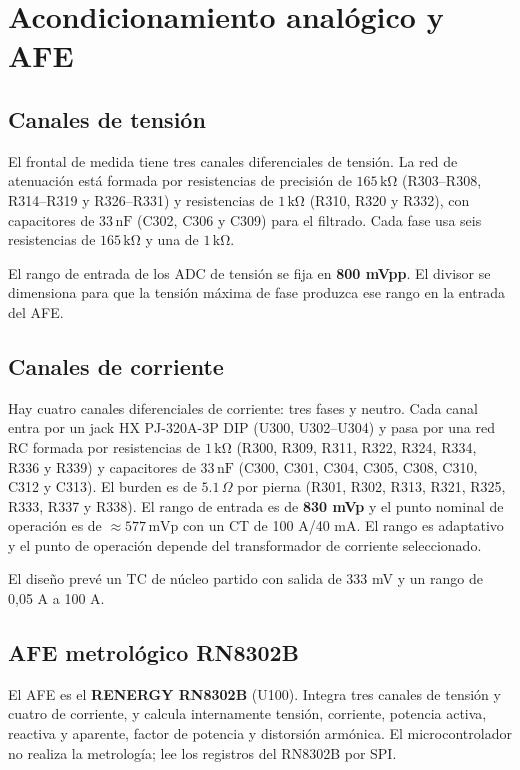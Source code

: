 \documentclass[11pt,a4paper]{article}
\begin{document}
\section{Acondicionamiento analógico y AFE}
\label{sec:medicion}

\subsection{Canales de tensión}

El frontal de medida tiene tres canales diferenciales de tensión. La red de
atenuación está formada por resistencias de precisión de
$165\,\mathrm{k\Omega}$ (R303--R308, R314--R319 y R326--R331) y resistencias de
$1\,\mathrm{k\Omega}$ (R310, R320 y R332), con capacitores de
$33\,\mathrm{nF}$ (C302, C306 y C309) para el filtrado. Cada fase
usa seis resistencias de $165\,\mathrm{k\Omega}$ y una de $1\,\mathrm{k\Omega}$.

El rango de entrada de los ADC de tensión se fija en \textbf{800 mVpp}. El
divisor se dimensiona para que la tensión máxima de fase produzca ese rango en
la entrada del AFE.

\subsection{Canales de corriente}

Hay cuatro canales diferenciales de corriente: tres fases y neutro. Cada canal
entra por un jack HX PJ-320A-3P DIP (U300, U302--U304) y pasa por
una red RC formada por resistencias de $1\,\mathrm{k\Omega}$ (R300, R309, R311, R322, R324, R334, R336 y R339) y
capacitores de $33\,\mathrm{nF}$ (C300, C301, C304, C305, C308, C310, C312 y C313). El burden es de $5.1\,\Omega$ por pierna (R301, R302, R313, R321, R325, R333, R337 y R338). El rango de entrada es de
\textbf{830 mVp} y el punto nominal de operación es de
$\approx 577\,\mathrm{mVp}$ con un CT de 100 A/40 mA. El rango es adaptativo y el punto de operación
depende del transformador de corriente seleccionado.

El diseño prevé un TC de núcleo partido con salida de 333 mV y un rango de
0,05 A a 100 A.

\subsection{AFE metrológico RN8302B}

El AFE es el \textbf{RENERGY RN8302B} (U100). Integra tres canales de tensión y
cuatro de corriente, y calcula internamente tensión, corriente, potencia activa,
reactiva y aparente, factor de potencia y distorsión armónica. El
microcontrolador no realiza la metrología; lee los registros del RN8302B por
SPI.
\end{document}
